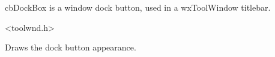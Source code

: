 %
%


\section{}\label{cbdockbox}


cbDockBox is a window dock button, used in a wxToolWindow titlebar.




<toolwnd.h>




\label{cbdockboxdraw}


Draws the dock button appearance.

